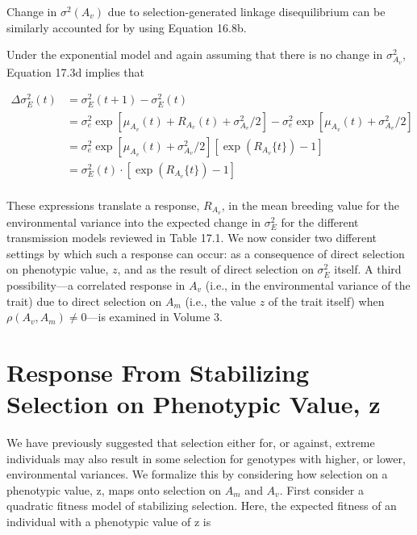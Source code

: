 \documentclass{article}
\begin{document}
Change in  $ \sigma^{2}(A_{v}) $ due to selection-generated linkage disequilibrium can be similarly accounted for by using Equation 16.8b.

Under the exponential model and again assuming that there is no change in  $ \sigma_{A_{v}}^{2} $, Equation 17.3d implies that

\begin{equation}
\begin{aligned}\Delta\sigma_{E}^{2}(t)&=\sigma_{E}^{2}(t+1)-\sigma_{E}^{2}(t)\\&=\sigma_{e}^{2}\exp\left[\mu_{A_{v}}(t)+R_{A_{v}}(t)+\sigma_{A_{v}}^{2}/2\right]-\sigma_{e}^{2}\exp\left[\mu_{A_{v}}(t)+\sigma_{A_{v}}^{2}/2\right]\\&=\sigma_{e}^{2}\exp\left[\mu_{A_{v}}(t)+\sigma_{A_{v}}^{2}/2\right]\left[\exp\left(R_{A_{v}}\{t\}\right)-1\right]\\&=\sigma_{E}^{2}(t)\cdot\left[\exp(R_{A_{v}}\{t\})-1\right]\\ \end{aligned}
\tag{17.6c}
\label{eq:17_6c}
\end{equation}

These expressions translate a response,  $ R_{A_v} $, in the mean breeding value for the environmental variance into the expected change in  $ \sigma_E^2 $ for the different transmission models reviewed in Table 17.1. We now consider two different settings by which such a response can occur: as a consequence of direct selection on phenotypic value,  $ z $, and as the result of direct selection on  $ \sigma_E^2 $ itself. A third possibility—a correlated response in  $ A_v $ (i.e., in the environmental variance of the trait) due to direct selection on  $ A_m $ (i.e., the value  $ z $ of the trait itself) when  $ \rho(A_v, A_m) \neq 0 $—is examined in Volume 3.

\section{Response From Stabilizing Selection on Phenotypic Value, z}
We have previously suggested that selection either for, or against, extreme individuals may also result in some selection for genotypes with higher, or lower, environmental variances. We formalize this by considering how selection on a phenotypic value, z, maps onto selection on  $ A_{m} $ and  $ A_{v} $. First consider a quadratic fitness model of stabilizing selection. Here, the expected fitness of an individual with a phenotypic value of z is
\end{document}

